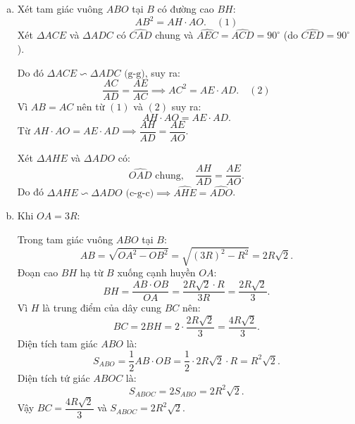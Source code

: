 \begin{bt}
{\begin{enumerate}[a)]
			Vì $AB = AC$ và $OB = OC = R$ nên $OA$ là đường trung trực của $BC \implies OA \perp BC$ tại $H$.
			
			Mặt khác $\widehat{DBC} = 90^\circ$ (góc nội tiếp chắn nửa đường tròn đường kính $CD$) $\implies BD \perp BC$.
			
			Từ đó suy ra $BD \parallel OA$ (vì cùng vuông góc với $BC$).
			\item Xét tam giác vuông $ABO$ tại $B$ có đường cao $BH$:
			$$AB^2 = AH \cdot AO. \quad (1)$$
			Xét $\Delta ACE$ và $\Delta ADC$ có $\widehat{CAD}$ chung và $\widehat{AEC} = \widehat{ACD} = 90^\circ$ (do $\widehat{CED} = 90^\circ$).
			
			Do đó $\Delta ACE \backsim \Delta ADC\text{ (g-g)}$, suy ra:
			$$\dfrac{AC}{AD} = \dfrac{AE}{AC} \implies AC^2 = AE \cdot AD. \quad (2)$$
			Vì $AB = AC$ nên từ $(1)$ và $(2)$ suy ra:
			$$AH \cdot AO = AE \cdot AD.$$
			Từ $AH \cdot AO = AE \cdot AD \implies \dfrac{AH}{AD} = \dfrac{AE}{AO}$.
			
			Xét $\Delta AHE$ và $\Delta ADO$ có:
			$$\widehat{OAD}\text{ chung},\quad \dfrac{AH}{AD} = \dfrac{AE}{AO}.$$
			Do đó $\Delta AHE \backsim \Delta ADO\text{ (c-g-c)} \implies \widehat{AHE} = \widehat{ADO}$.
			\item Khi $OA = 3R$:
			
			Trong tam giác vuông $ABO$ tại $B$:
			$$AB = \sqrt{OA^2 - OB^2} = \sqrt{(3R)^2 - R^2} = 2R\sqrt{2}.$$
			Đoạn cao $BH$ hạ từ $B$ xuống cạnh huyền $OA$:
			$$BH = \dfrac{AB \cdot OB}{OA} = \dfrac{2R\sqrt{2} \cdot R}{3R} = \dfrac{2R\sqrt{2}}{3}.$$
			Vì $H$ là trung điểm của dây cung $BC$ nên:
			$$BC = 2BH = 2 \cdot \dfrac{2R\sqrt{2}}{3} = \dfrac{4R\sqrt{2}}{3}.$$
			Diện tích tam giác $ABO$ là:
			$$S_{ABO} = \dfrac{1}{2} AB \cdot OB = \dfrac{1}{2} \cdot 2R\sqrt{2} \cdot R = R^2\sqrt{2}.$$
			Diện tích tứ giác $ABOC$ là:
			$$S_{ABOC} = 2S_{ABO} = 2R^2\sqrt{2}.$$
			Vậy $BC = \dfrac{4R\sqrt{2}}{3}$ và $S_{ABOC} = 2R^2\sqrt{2}$.
		\end{enumerate}
}
\end{bt}

